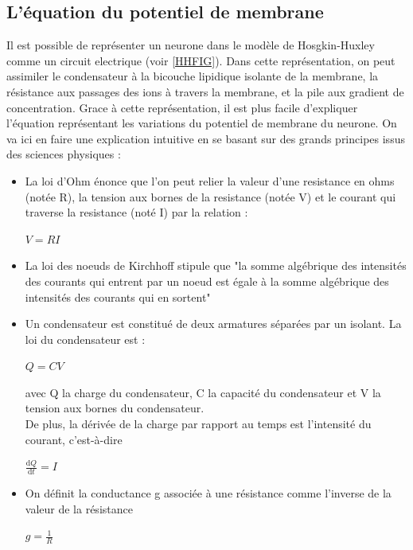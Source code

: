 \documentclass[12pt]{scrartcl}
\newcommand{\dd}{\mathrm{d}}
\begin{document}
	\subsection{L'équation du potentiel de membrane}
Il est possible de représenter un neurone dans le modèle de Hosgkin-Huxley comme un circuit electrique (voir \ref{HHFIG}). Dans cette représentation, on peut assimiler le condensateur à la bicouche lipidique isolante de la membrane, la résistance aux passages des ions à travers la membrane, et la pile aux gradient de concentration. Grace à cette représentation, il est plus facile d'expliquer l'équation représentant les variations du potentiel de membrane du neurone. On va ici en faire une explication intuitive en se basant sur des grands principes issus des sciences physiques :
\begin{itemize}
\item La loi d'Ohm énonce que l'on peut relier la valeur d'une resistance en ohms (notée R), la tension aux bornes de la resistance (notée V) et le courant qui traverse la resistance (noté I) par la relation : \begin{center}$ V = RI $\end{center}
\item La loi des noeuds de Kirchhoff stipule que "la somme algébrique des intensités des courants qui entrent par un noeud est égale à la somme algébrique des intensités des courants qui en sortent"
\item Un condensateur est constitué de deux armatures séparées par un isolant. La loi du condensateur est : \begin{center} $Q = CV$ \end{center} avec Q la charge du condensateur, C la capacité du condensateur et V la tension aux bornes du condensateur.\\De plus, la dérivée de la charge par rapport au temps est l'intensité du courant, c'est-à-dire \begin{center}$\displaystyle \frac{\dd Q}{\dd t} = I $ \end{center}
\item On définit la conductance g associée à une résistance comme l'inverse de la valeur de la résistance \begin{center} $g = \displaystyle \frac{1}{R}$ \end{center}
\end{itemize}
\end{document}
